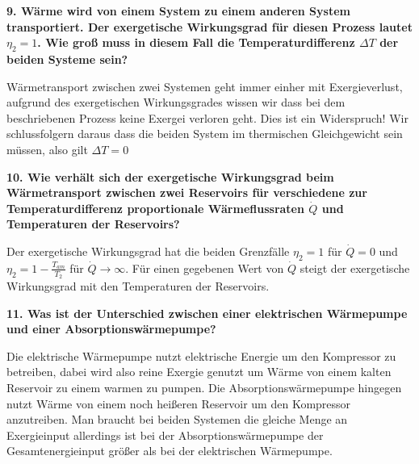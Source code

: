 \noindent\textbf{9. Wärme wird von einem System zu einem anderen System transportiert. Der exergetische Wirkungsgrad für diesen Prozess lautet $\eta_2 =1$. Wie groß muss in diesem Fall die Temperaturdifferenz $\Delta T$ der beiden Systeme sein?}\\
\begin{addmargin}[25pt]{0pt}     
Wärmetransport zwischen zwei Systemen geht immer einher mit Exergieverlust, aufgrund des exergetischen Wirkungsgrades wissen wir dass bei dem beschriebenen Prozess keine Exergei verloren geht. Dies ist ein Widerspruch! Wir schlussfolgern daraus dass die beiden System im thermischen Gleichgewicht sein müssen, also gilt $\Delta T= 0$\\
\end{addmargin}

\noindent \textbf{10. Wie verhält sich der exergetische Wirkungsgrad beim Wärmetransport zwischen zwei Reservoirs für verschiedene zur Temperaturdifferenz proportionale Wärmeflussraten $\dot{Q}$ und Temperaturen der Reservoirs?}\\
\begin{addmargin}[25pt]{0pt}
    Der exergetische Wirkungsgrad hat die beiden Grenzfälle $\eta_2 = 1$ für $\dot{Q} = 0$ und $\eta_2 = 1- \frac{T_{\si{am}}}{T_2}$ für $\dot{Q} \rightarrow \infty$. Für einen gegebenen Wert von $\dot{Q}$ steigt der exergetische Wirkungsgrad mit den Temperaturen der Reservoirs. \\
\end{addmargin}

\noindent \textbf{11. Was ist der Unterschied zwischen einer elektrischen Wärmepumpe und einer Absorptionswärmepumpe?}\\
\begin{addmargin}[25pt]{0pt}
    Die elektrische Wärmepumpe nutzt elektrische Energie um den Kompressor zu betreiben, dabei wird also reine Exergie genutzt um Wärme von einem kalten Reservoir zu einem warmen zu pumpen. Die Absorptionswärmepumpe hingegen nutzt Wärme von einem noch heißeren Reservoir um den Kompressor anzutreiben. Man braucht bei beiden Systemen die gleiche Menge an Exergieinput allerdings ist bei der Absorptionswärmepumpe der Gesamtenergieinput größer als bei der elektrischen Wärmepumpe.\\
\end{addmargin}

